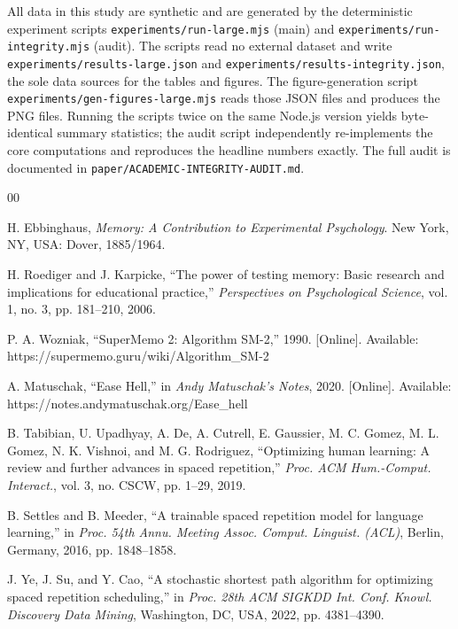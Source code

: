 \documentclass[conference]{IEEEtran}
\begin{document}
All data in this study are synthetic and are generated by the deterministic experiment scripts \texttt{experiments/run-large.mjs} (main) and \texttt{experiments/run-integrity.mjs} (audit). The scripts read no external dataset and write \texttt{experiments/results-large.json} and \texttt{experiments/results-integrity.json}, the sole data sources for the tables and figures. The figure-generation script \texttt{experiments/gen-figures-large.mjs} reads those JSON files and produces the PNG files. Running the scripts twice on the same Node.js version yields byte-identical summary statistics; the audit script independently re-implements the core computations and reproduces the headline numbers exactly. The full audit is documented in \texttt{paper/ACADEMIC-INTEGRITY-AUDIT.md}.

\begin{thebibliography}{00}

 H. Ebbinghaus, \textit{Memory: A Contribution to Experimental Psychology}. New York, NY, USA: Dover, 1885/1964.

 H. Roediger and J. Karpicke, ``The power of testing memory: Basic research and implications for educational practice,'' \textit{Perspectives on Psychological Science}, vol. 1, no. 3, pp. 181--210, 2006.

 P. A. Wozniak, ``SuperMemo 2: Algorithm SM-2,'' 1990. [Online]. Available: https://supermemo.guru/wiki/Algorithm\_SM-2

 A. Matuschak, ``Ease Hell,'' in \textit{Andy Matuschak's Notes}, 2020. [Online]. Available: https://notes.andymatuschak.org/Ease\_hell

 B. Tabibian, U. Upadhyay, A. De, A. Cutrell, E. Gaussier, M. C. Gomez, M. L. Gomez, N. K. Vishnoi, and M. G. Rodriguez, ``Optimizing human learning: A review and further advances in spaced repetition,'' \textit{Proc. ACM Hum.-Comput. Interact.}, vol. 3, no. CSCW, pp. 1--29, 2019.

 B. Settles and B. Meeder, ``A trainable spaced repetition model for language learning,'' in \textit{Proc. 54th Annu. Meeting Assoc. Comput. Linguist. (ACL)}, Berlin, Germany, 2016, pp. 1848--1858.

 J. Ye, J. Su, and Y. Cao, ``A stochastic shortest path algorithm for optimizing spaced repetition scheduling,'' in \textit{Proc. 28th ACM SIGKDD Int. Conf. Knowl. Discovery Data Mining}, Washington, DC, USA, 2022, pp. 4381--4390.


\end{thebibliography}
\end{document}
